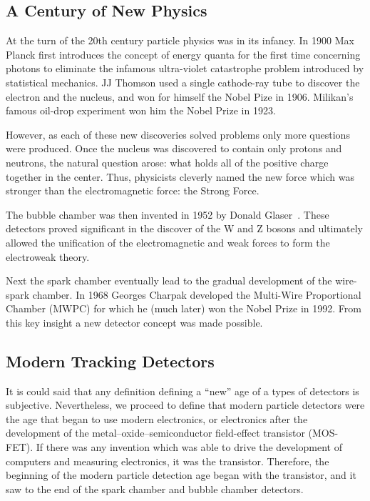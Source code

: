\subsection{A Century of New Physics}

At the turn of the 20th century particle physics was in its infancy.
In 1900 Max Planck first introduces the concept of energy quanta for the first time concerning photons to eliminate the infamous ultra-violet catastrophe problem introduced by statistical mechanics.
JJ Thomson used a single cathode-ray tube to discover the electron and the nucleus, and won for himself the Nobel Pize in 1906.
Milikan's famous oil-drop experiment won him the Nobel Prize in 1923.

However, as each of these new discoveries solved problems only more questions were produced.
Once the nucleus was discovered to contain only protons and neutrons, the natural question arose: what holds all of the positive charge together in the center.
Thus, physicists cleverly named the new force which was stronger than the electromagnetic force: the Strong Force.

The bubble chamber was then invented in 1952 by Donald Glaser~\citep{bubbleChamber_PhysRev.87.665}.
These detectors proved significant in the discover of the W and Z bosons and ultimately allowed the unification of the electromagnetic and weak forces to form the electroweak theory.

Next the spark chamber eventually lead to the gradual development of the wire-spark chamber.
In 1968 Georges Charpak developed the Multi-Wire Proportional Chamber (MWPC) for which he (much later) won the Nobel Prize in 1992.
From this key insight a new detector concept was made possible.

\subsection{Modern Tracking Detectors}

It is could said that any definition defining a ``new'' age of a types of detectors is subjective.
Nevertheless, we proceed to define that modern particle detectors were the age that began to use modern electronics, or electronics after the development of the metal–oxide–semiconductor field-effect transistor (MOS-FET).
If there was any invention which was able to drive the development of computers and  measuring electronics, it was the transistor.
Therefore, the beginning of the modern particle detection age began with the transistor, and it saw to the end of the spark chamber and bubble chamber detectors.

